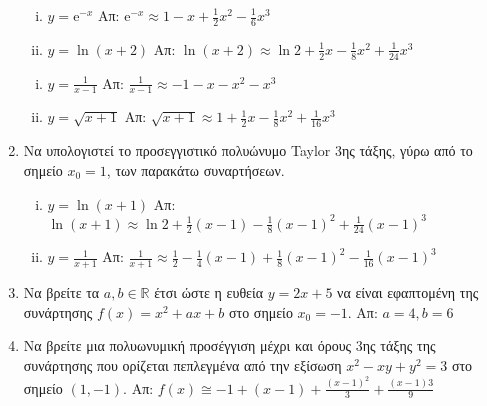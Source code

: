 \documentclass[a4paper,table]{report}
\newcommand{\twocolumnsidesss}[2]{\begin{minipage}[t]{0.52\linewidth}\raggedright
        #1
        \end{minipage}\hfill\begin{minipage}[t]{0.47\linewidth}\raggedright
        #2
    \end{minipage}
}
\begin{document}
\begin{enumerate}
    \twocolumnsidesss{
      \begin{enumerate}[i)]
        \item $ y= \mathrm{e}^{-x} $ 
          \hfill Απ: $ \mathrm{e}^{-x} \approx 1-x+ \frac{1}{2} x^{2} - \frac{1}{6} x^{3} $ 
        \item $ y= \ln{(x+2)} $ \;
          \hfill Απ: $ \ln{(x+2)} \approx \ln{2} + \frac{1}{2} x - \frac{1}{8} x^{2} +
          \frac{1}{24} x^{3} $ 
      \end{enumerate}
    }{
      \begin{enumerate}[i)]
        \item $ y= \frac{1}{x-1} $ \hfill Απ: $ \frac{1}{x-1} \approx -1 -x -x^{2} - x^{3} $ 
        \item $ y= \sqrt{x+1} $ \hfill Απ: $ \sqrt{x+1} \approx 1 + \frac{1}{2} x -
          \frac{1}{8} x^{2} + \frac{1}{16} x^{3} $ 
      \end{enumerate}
    }

  \item  Να υπολογιστεί το προσεγγιστικό πολυώνυμο Taylor 3ης τάξης, γύρω από 
    το σημείο $ x_{0}=1 $, των παρακάτω συναρτήσεων.
    \begin{enumerate}[i)]
      \item $ y= \ln{(x+1)} $ 
        \hfill Απ: $ \ln{(x+1)} \approx \ln{2} + \frac{1}{2} (x-1) - \frac{1}{8}
        (x-1)^{2} + \frac{1}{24} (x-1)^{3} $ 
      \item $ y= \frac{1}{x+1} $ \hfill Απ: $ \frac{1}{x+1} \approx \frac{1}{2} -
        \frac{1}{4} (x-1) + \frac{1}{8} (x-1)^{2} - \frac{1}{16} (x-1)^{3} $ 
    \end{enumerate}

  \item Να βρείτε τα $ a, b \in \mathbb{R} $ έτσι ώστε η ευθεία $ y = 2x + 5
    $ να είναι εφαπτομένη της συνάρτησης $ f(x) = x^{2} + ax + b $ στο
    σημείο $ x_{0} = -1 $. 
    \hfill Απ: $ a = 4, b = 6 $

  \item Να βρείτε μια πολυωνυμική προσέγγιση μέχρι και 
    όρους 3ης τάξης της συνάρτησης που ορίζεται πεπλεγμένα από την εξίσωση 
    $ x^{2} - xy + y^{2} = 3$ στο σημείο $ (1,-1) $.
    \hfill Απ: $f(x) \cong -1 + (x-1) + \frac{(x-1)^{2}}{3} + \frac{(x-1){3}}{9}$
\end{enumerate}
\end{document}
